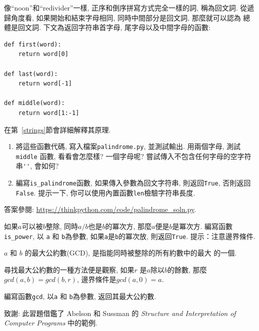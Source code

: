 \documentclass[10pt]{book}
\begin{document}
\begin{exercise}
\label{palindrome}

像``noon''和``redivider''一樣, 正序和倒序拼寫方式完全一樣的詞, 稱為回文詞. 
從遞歸角度看, 如果開始和結束字母相同, 同時中間部分是回文詞, 那麼就可以認為
總體是回文詞. 
下文為返回字符串首字母, 尾字母以及中間字母的函數:

\begin{verbatim}
def first(word):
    return word[0]

def last(word):
    return word[-1]

def middle(word):
    return word[1:-1]
\end{verbatim}
%

在第~\ref{strings}節會詳細解釋其原理.

\begin{enumerate}

\item 將這些函數代碼, 寫入檔案{\tt palindrome.py}, 並測試輸出. 
用兩個字母, 測試 {\tt middle} 函數, 看看會怎麼樣? 一個字母呢?  
嘗試傳入不包含任何字母的空字符串\verb"''",  會如何?

\item 編寫\verb"is_palindrome"函數, 如果傳入參數為回文字符串, 
則返回{\tt True},  否則返回{\tt False}. 
提示一下, 你可以使用內置函數{\tt len}檢驗字符串長度. 

\end{enumerate}

答案參閱: \url{https://thinkpython.com/code/palindrome_soln.py}.

\end{exercise}

\begin{exercise}

如果$a$可以被$b$整除, 同時$a/b$也是$b$的冪次方, 那麼$a$便是$b$是冪次方. 
編寫函數\verb"is_power", 
以 {\tt a} 和 {\tt b}為參數, 如果{\tt a}是{\tt b}的冪次放, 則返回{\tt True}. 
提示：注意邊界條件. 

\end{exercise}


\begin{exercise}

 $a$ 和 $b$ 的最大公約數(GCD), 是指能同時被整除的所有約數中的最大
的一個. 

尋找最大公約數的一種方法便是觀察, 如果$r$ 是$a$除以$b$的餘數, 
那麼$gcd(a, b) = gcd(b, r)$, 邊界條件是$gcd(a, 0) = a$.

編寫函數\verb"gcd", 以{\tt a} 和 {\tt b}為參數, 返回其最大公約數. 


致謝: 此習題借鑑了 Abelson 和
Sussman 的 {\em Structure and Interpretation of Computer Programs} 中的範例.

\end{exercise}
\end{document}
